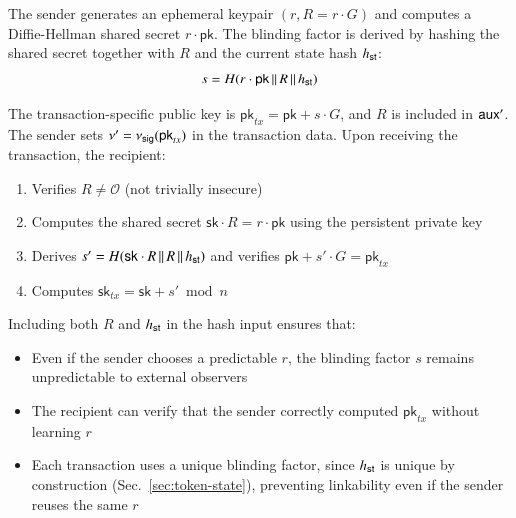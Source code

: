 The sender generates an ephemeral keypair $(r, R = r \cdot G)$ and computes a Diffie-Hellman shared secret $r \cdot \mathsf{pk}$. The blinding factor is derived by hashing the shared secret together with $R$ and the current state hash ${h_\mathsf{st}}$:
$$s = H(r \cdot \mathsf{pk} \,\|\, R \,\|\, {h_\mathsf{st}})$$

The transaction-specific public key is $\mathsf{pk}_{tx} = \mathsf{pk} + s \cdot G$, and $R$ is included in $\mathsf{aux}'$. The sender sets $\nu' = \nu_\mathsf{sig}(\mathsf{pk}_{tx})$ in the transaction data. Upon receiving the transaction, the recipient:
\begin{enumerate}
\item Verifies $R \neq \mathcal{O}$ (not trivially insecure)
\item Computes the shared secret $\mathsf{sk} \cdot R = r \cdot \mathsf{pk}$ using the persistent private key
\item Derives $s' = H(\mathsf{sk} \cdot R \,\|\, R \,\|\, {h_\mathsf{st}})$ and verifies $\mathsf{pk} + s' \cdot G = \mathsf{pk}_{tx}$
\item Computes $\mathsf{sk}_{tx} = \mathsf{sk} + s' \bmod n$
\end{enumerate}

Including both $R$ and ${h_\mathsf{st}}$ in the hash input ensures that:
\begin{itemize}
\item Even if the sender chooses a predictable $r$, the blinding factor $s$ remains unpredictable to external observers
\item The recipient can verify that the sender correctly computed $\mathsf{pk}_{tx}$ without learning $r$
\item Each transaction uses a unique blinding factor, since ${h_\mathsf{st}}$ is unique by construction (Sec.~\ref{sec:token-state}), preventing linkability even if the sender reuses the same $r$
\end{itemize}
